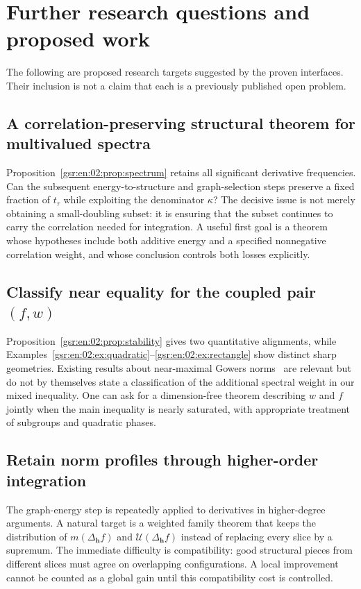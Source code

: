 \documentclass[11pt,letterpaper]{article}
\numberwithin{equation}{section}
\theoremstyle{definition}
\theoremstyle{remark}
\newcommand{\1}{\mathbf 1}
\newcommand{\U}{\mathcal U}
\newcommand{\srctag}[1]{\texorpdfstring{\enspace\textup{[#1]}}{ [#1]}}
\newcommand{\srcnote}[2]{\par\noindent{\small\textit{Source #1, delivered #2.}}\par}
\begin{document}
\section[{Further research questions and proposed work\srctag{02}}]{Further research questions and proposed work}\label{gsr:fz:02:sec:d11}\label{gsr:fz:02:sec:questions}
\srcnote{02}{Section 11}
The following are proposed research targets suggested by the proven interfaces. Their inclusion is not a claim that each is a previously published open problem.

\subsection{A correlation-preserving structural theorem for multivalued spectra}
Proposition~\ref{gsr:en:02:prop:spectrum} retains all significant derivative frequencies. Can the subsequent energy-to-structure and graph-selection steps preserve a fixed fraction of $t_\tau$ while exploiting the denominator $\kappa$? The decisive issue is not merely obtaining a small-doubling subset: it is ensuring that the subset continues to carry the correlation needed for integration. A useful first goal is a theorem whose hypotheses include both additive energy and a specified nonnegative correlation weight, and whose conclusion controls both losses explicitly.

\subsection{Classify near equality for the coupled pair \texorpdfstring{$(f,w)$}{(f,w)}}
Proposition~\ref{gsr:en:02:prop:stability} gives two quantitative alignments, while Examples~\ref{gsr:en:02:ex:quadratic}--\ref{gsr:en:02:ex:rectangle} show distinct sharp geometries. Existing results about near-maximal Gowers norms~\cite{eisnertao} are relevant but do not by themselves state a classification of the additional spectral weight in our mixed inequality. One can ask for a dimension-free theorem describing $w$ and $f$ jointly when the main inequality is nearly saturated, with appropriate treatment of subgroups and quadratic phases.

\subsection{Retain norm profiles through higher-order integration}
The graph-energy step is repeatedly applied to derivatives in higher-degree arguments. A natural target is a weighted family theorem that keeps the distribution of $m(\Delta_{\mathbf h}f)$ and $\U(\Delta_{\mathbf h}f)$ instead of replacing every slice by a supremum. The immediate difficulty is compatibility: good structural pieces from different slices must agree on overlapping configurations. A local improvement cannot be counted as a global gain until this compatibility cost is controlled.
\end{document}

